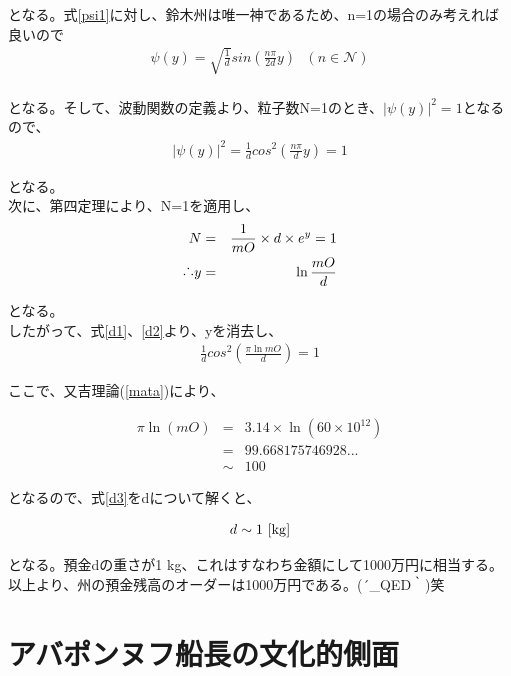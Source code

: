 \documentclass[12pt]{jsarticle}
\begin{document}
となる。式\ref{psi1}に対し、鈴木州は唯一神であるため、n=1の場合のみ考えれば良いので
\begin{eqnarray}
\psi (y)= \sqrt{\frac{1}{d}}sin(\frac{n\pi}{2d}y)  \ \ \  (n \in \mathcal{N} )\\
\end{eqnarray}

となる。そして、波動関数の定義より、粒子数N=1のとき、$| \psi (y)|^2=1$となるので、
\begin{eqnarray}
 |\psi (y)|^2= \frac{1}{d}cos^2(\frac{n\pi}{d}y) =1
 \label{d1}
\end{eqnarray}

となる。\\
次に、第四定理により、N=1を適用し、
\begin{eqnarray}
N&=&\frac{1}{mO} \times d \times e^{y} =1\\
\raisebox{.2ex}{.}\raisebox{1.2ex}{.}\raisebox{.2ex}{.} y&=&\ln\frac{mO}{d}
\label{d2}
\end{eqnarray}

となる。\\
したがって、式\ref{d1}、\ref{d2}より、yを消去し、
\begin{eqnarray}
 \frac{1}{d}cos^2(\frac{\pi \ln mO}{d}) =1
 \label{d3}
\end{eqnarray}

ここで、又吉理論(\ref{mata})により、

\begin{eqnarray}
 \pi \ln (mO) &=& 3.14\times \ln (60\times10^{12})\nonumber\\
 &=&99.668175746928...\nonumber\\
 &\sim&100
\end{eqnarray}

となるので、式\ref{d3}をdについて解くと、

\begin{eqnarray}
d \sim 1 \ [\rm{kg}]
\end{eqnarray}

となる。預金dの重さが1 kg、これはすなわち金額にして1000万円に相当する。\\
\large{以上より、州の預金残高のオーダーは1000万円である。\sf(´\_QED｀)笑}


\newpage

\section{アバポンヌフ船長の文化的側面}
\end{document}
